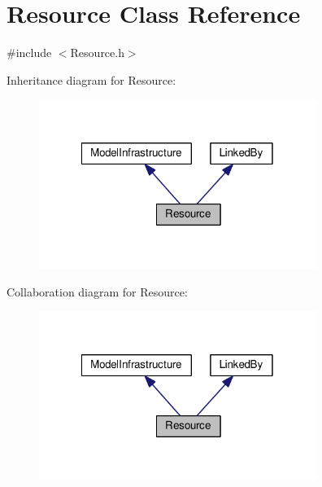 \hypertarget{class_resource}{\section{Resource Class Reference}
\label{class_resource}
}


{\ttfamily \#include $<$Resource.\-h$>$}



Inheritance diagram for Resource\-:\nopagebreak
\begin{figure}[H]
\begin{center}
\leavevmode
\includegraphics[width=255pt]{class_resource__inherit__graph}
\end{center}
\end{figure}


Collaboration diagram for Resource\-:\nopagebreak
\begin{figure}[H]
\begin{center}
\leavevmode
\includegraphics[width=255pt]{class_resource__coll__graph}
\end{center}
\end{figure}
